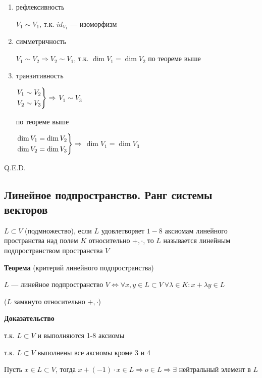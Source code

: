 \documentclass[twoside]{book}
\begin{document}
\begin{enumerate}
    \item рефлексивность

          \(V_1 \sim V_1\), т.к. \(id_{V_1}\) --- изоморфизм

    \item симметричность

          \(V_1 \sim V_2 \Rightarrow V_2 \sim V_1\), т.к. \(\dim V_1 = \dim V_2\) по теореме выше

    \item транзитивность

          \(\begin{rcases*}
              V_1 \sim V_2 \\
              V_2 \sim V_3
          \end{rcases*} \Rightarrow\) \(V_1 \sim V_3\)

          по теореме выше

          \(\begin{rcases*}
              \dim V_1 = \dim V_2 \\
              \dim V_2 = \dim V_3
          \end{rcases*} \Rightarrow\) \(\dim V_1 = \dim V_3\)

\end{enumerate}
\hfill Q.E.D.

\subsection{Линейное подпространство. Ранг системы векторов}

\(L \subset V\) (подмножество), если \(L\) удовлетворяет \(1-8\) аксиомам линейного пространства над полем \(K\) относительно \(+, \cdot\), то \(L\) называется линейным подпространством пространства \(V\)

\textbf{Теорема} (критерий линейного подпространства)

\(L\) --- линейное подпространство \(V \Leftrightarrow \forall x, y \in L \subset V \ \forall \lambda \in K: x + \lambda y \in L\)

(\(L\) замкнуто относительно \(+, \cdot\))

\textbf{Доказательство}

\fbox{\(\Rightarrow\)}
т.к. \(L \subset V\) и выполняются 1-8 аксиомы

\fbox{\(\Leftarrow\)}
т.к. \(L \subset V\) выполнены все аксиомы кроме 3 и 4

Пусть \(x \in L \subset V\), тогда \(x + (-1) \cdot x \in L \Rightarrow o \in L \Rightarrow \exists\) нейтральный элемент в \(L\)
\end{document}

